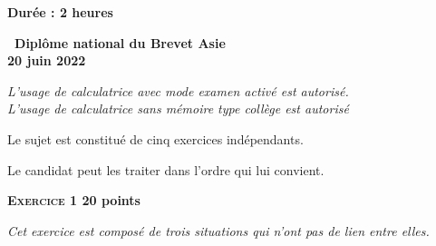 \documentclass[11pt]{article}
\begin{document}
\label{Asie}

\pagestyle{fancy}
\thispagestyle{empty}

\begin{center}\textbf{Durée : 2 heures}

\vspace{0,5cm}

{\Large\textbf{\decofourleft~Diplôme national du Brevet
Asie~\decofourright}}\\[6pt]
{\Large \textbf{20 juin 2022}}


\medskip

\emph{L'usage de calculatrice avec mode examen activé est autorisé.\\
L'usage de calculatrice sans mémoire \og type collège \fg{} est autorisé}


\medskip

Le sujet est constitué de cinq exercices indépendants.

Le candidat peut les traiter dans l'ordre qui lui convient.
\end{center}

\vspace{0,5cm}

\textbf{{\large \textsc{Exercice 1}} \hfill 20 points}

\medskip

\emph{Cet exercice est composé de trois situations qui n’ont pas de lien entre elles.}

\medskip
\end{document}
